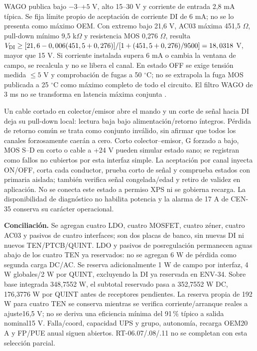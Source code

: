 WAGO publica bajo $-3$--$+5$ V, alto 15--30 V y corriente de entrada 2,8 mA típica. Se fija límite propio de aceptación de corriente DI de 6 mA; no se lo presenta como máximo OEM. Con extremo bajo 21,6 V, AC03 máxima 451,5 $\Omega$, pull-down mínimo 9,5 k$\Omega$ y resistencia MOS 0,276 $\Omega$, resulta $V_{\rm DI}\ge[21,6-0,006(451,5+0,276)]/[1+(451,5+0,276)/9500]=18,0318$ V, mayor que 15 V. Si corriente instalada supera 6 mA o cambia la ventana de campo, se recalcula y no se libera el canal. En estado OFF se exige tensión medida $\le5$ V y comprobación de fugas a 50 $^\circ$C; no se extrapola la fuga MOS publicada a 25 $^\circ$C como máximo completo de todo el circuito. El filtro WAGO de 3 ms no se transforma en latencia máxima conjunta \parencite[p.~14]{lote38-wagodi}.

Un cable cortado en colector/emisor abre el mando y un corte de señal hacia DI deja su pull-down local: lectura baja bajo alimentación/retorno íntegros. Pérdida de retorno común se trata como conjunto inválido, sin afirmar que todos los canales forzosamente caerán a cero. Corto colector--emisor, G forzado a bajo, MOS S--D en corto o cable a +24 V pueden simular estado sano; se registran como fallos no cubiertos por esta interfaz simple. La aceptación por canal inyecta ON/OFF, corta cada conductor, prueba corto de señal y comprueba estados con primaria aislada; también verifica señal congelada/edad y retiro de validez en aplicación. No se conecta este estado a permiso XPS ni se gobierna recarga. La disponibilidad de diagnóstico no habilita potencia y la alarma de 17 A de CEN-35 conserva su carácter operacional.

\textbf{Conciliación.} Se agregan cuatro LDO, cuatro MOSFET, cuatro zéner, cuatro AC03 y pasivos de cuatro interfaces; son dos placas de banco, sin nuevas DI ni nuevos TEN/PTCB/QUINT. LDO y pasivos de posregulación permanecen aguas abajo de los cuatro TEN ya reservados: no se agregan 6 W de pérdida como segunda carga DC/AC. Se reserva adicionalmente 1 W de campo por interfaz, 4 W globales/2 W por QUINT, excluyendo la DI ya reservada en ENV-34. Sobre base integrada 348,7552 W, el subtotal reservado pasa a 352,7552 W DC, 176,3776 W por QUINT antes de receptores pendientes. La reserva propia de 192 W para cuatro TEN se conserva mientras se verifica corriente/arranque reales a ajuste16,5 V; no se deriva una eficiencia mínima del 91\,\% típico a salida nominal15 V. Falla/coord, capacidad UPS y grupo, autonomía, recarga OEM20 A y FP/PUE anual siguen abiertos. RT-06.07/.08/.11 no se completan con esta selección parcial.
